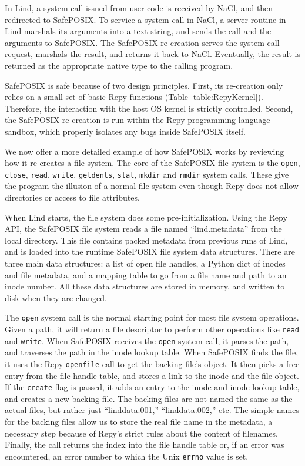 In Lind, a system call issued from user code is
received by NaCl, and then redirected to SafePOSIX.
To service a system call in NaCl, a server routine in
Lind marshals its arguments into a text string, and sends the call and the arguments
to SafePOSIX. The SafePOSIX re-creation serves the system call request, marshals the result, and
returns it back to NaCl. Eventually, the result is returned as the appropriate
native type to the calling program.

SafePOSIX is safe because of two design principles.
First, its re-creation only relies on a small set of basic Repy functions (Table \ref{table:RepyKernel}).
Therefore, the interaction with the host OS kernel is strictly controlled.
Second, the SafePOSIX re-creation is run within the Repy programming language sandbox,
which properly isolates any bugs inside SafePOSIX itself.

We now offer a more detailed example of how SafePOSIX works by reviewing how it re-creates a file system. 
The core of the SafePOSIX file system is the \texttt{open}, \texttt{close}, \texttt{read}, \texttt{write},
\texttt{getdents}, \texttt{stat}, \texttt{mkdir} and \texttt{rmdir} system calls.
These give the program the illusion of a normal file system even though Repy does not allow directories or access to file attributes.

When Lind starts, the file system does some pre-initialization. Using the Repy API, the SafePOSIX file system reads a file named ``lind.metadata''
from the local directory. This file contains packed metadata from previous runs of Lind,
and is loaded into the runtime SafePOSIX file system data structures.
There are three main data structures: a list of open file handles, a Python dict of inodes and file metadata,
and a mapping table to go from a file name and path to an inode number.
All these data structures are stored in memory, and written to disk when they are changed.

The \texttt{open} system call is the normal starting point for most file system operations.
Given a path, it will return a file descriptor to perform other operations like \texttt{read} and \texttt{write}.
When SafePOSIX receives the \texttt{open} system call, it parses the path, and
traverses the path in the inode lookup table.
When SafePOSIX finds the file, it uses the Repy \texttt{openfile} call to get the backing file's object.
It then picks a free entry from the file handle table, and stores a link to the inode and the file object.
If the \texttt{create} flag is passed, it adds an entry to the inode and inode lookup table, and creates a new backing file.
The backing files are not named the same as the actual files, but rather just ``linddata.001,'' ``linddata.002,'' etc.
The simple names for the backing files allow us to store the real file name in the metadata, a
necessary step because of Repy's strict rules about the content of filenames.
Finally, the call returns the index into the file handle table or, if an error was encountered, an error number to which the Unix \texttt{errno} value is set.

